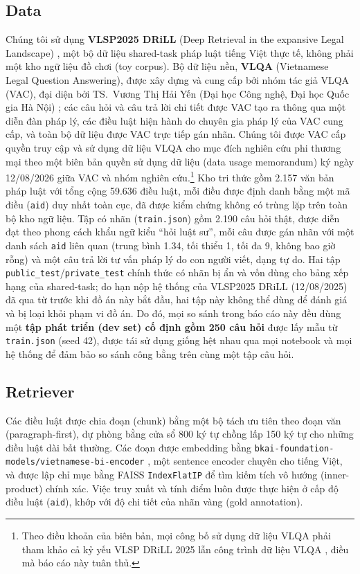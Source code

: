 \documentclass[11pt]{article}
\begin{document}
\subsection{Data}
Chúng tôi sử dụng \textbf{VLSP2025 DRiLL} (Deep Retrieval in the expansive Legal Landscape) \citep{vlsp2025drill}, một bộ dữ liệu shared-task pháp luật tiếng Việt thực tế, không phải một kho ngữ liệu đồ chơi (toy corpus). Bộ dữ liệu nền, \textbf{VLQA} (Vietnamese Legal Question Answering), được xây dựng và cung cấp bởi nhóm tác giả VLQA (VAC), đại diện bởi TS.~Vương Thị Hải Yến (Đại học Công nghệ, Đại học Quốc gia Hà Nội) \citep{vuong2025vlqa}; các câu hỏi và câu trả lời chi tiết được VAC tạo ra thông qua một diễn đàn pháp lý, các điều luật hiện hành do chuyên gia pháp lý của VAC cung cấp, và toàn bộ dữ liệu được VAC trực tiếp gán nhãn. Chúng tôi được VAC cấp quyền truy cập và sử dụng dữ liệu VLQA cho mục đích nghiên cứu phi thương mại theo một biên bản quyền sử dụng dữ liệu (data usage memorandum) ký ngày 12/08/2026 giữa VAC và nhóm nghiên cứu.\footnote{Theo điều khoản của biên bản, mọi công bố sử dụng dữ liệu VLQA phải tham khảo cả kỷ yếu VLSP DRiLL 2025 \citep{vlsp2025drill} lẫn công trình dữ liệu VLQA \citep{vuong2025vlqa}, điều mà báo cáo này tuân thủ.} Kho tri thức gồm 2.157 văn bản pháp luật với tổng cộng 59.636 điều luật, mỗi điều được định danh bằng một mã điều (\texttt{aid}) duy nhất toàn cục, đã được kiểm chứng không có trùng lặp trên toàn bộ kho ngữ liệu. Tập có nhãn (\texttt{train.json}) gồm 2.190 câu hỏi thật, được diễn đạt theo phong cách khẩu ngữ kiểu ``hỏi luật sư'', mỗi câu được gán nhãn với một danh sách \texttt{aid} liên quan (trung bình 1.34, tối thiểu 1, tối đa 9, không bao giờ rỗng) và một câu trả lời tư vấn pháp lý do con người viết, dạng tự do. Hai tập \texttt{public\_test}/\texttt{private\_test} chính thức có nhãn bị ẩn và vốn dùng cho bảng xếp hạng của shared-task; do hạn nộp hệ thống của VLSP2025 DRiLL (12/08/2025) đã qua từ trước khi đồ án này bắt đầu, hai tập này không thể dùng để đánh giá và bị loại khỏi phạm vi đồ án. Do đó, mọi so sánh trong báo cáo này đều dùng một \textbf{tập phát triển (dev set) cố định gồm 250 câu hỏi} được lấy mẫu từ \texttt{train.json} (seed 42), được tái sử dụng giống hệt nhau qua mọi notebook và mọi hệ thống để đảm bảo so sánh công bằng trên cùng một tập câu hỏi.

\subsection{Retriever}
Các điều luật được chia đoạn (chunk) bằng một bộ tách ưu tiên theo đoạn văn (paragraph-first), dự phòng bằng cửa sổ 800 ký tự chồng lấp 150 ký tự cho những điều luật dài bất thường. Các đoạn được embedding bằng \texttt{bkai-foundation-models/vietnamese-bi-encoder} \citep{bkai2023vibienc}, một sentence encoder chuyên cho tiếng Việt, và được lập chỉ mục bằng FAISS \texttt{IndexFlatIP} \citep{johnson2019billion} để tìm kiếm tích vô hướng (inner-product) chính xác. Việc truy xuất và tính điểm luôn được thực hiện ở cấp độ điều luật (\texttt{aid}), khớp với độ chi tiết của nhãn vàng (gold annotation).
\end{document}
